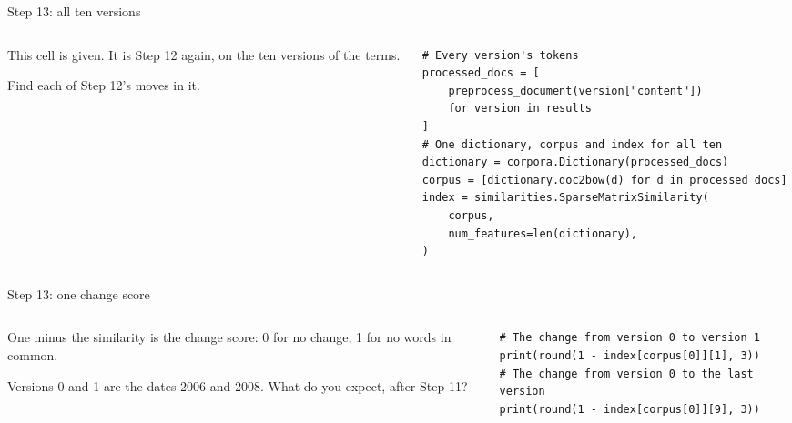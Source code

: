 \documentclass[9pt,aspectratio=169]{beamer}
\begin{document}
\begin{frame}[fragile]{Step 13: all ten versions}
    \begin{columns}[T]
        \begin{column}{0.37\textwidth}
            This cell is given. It is Step 12 again, on the ten versions of the terms.

            \medskip
            Find each of Step 12's moves in it.
        \end{column}
        \begin{column}{0.6\textwidth}
\begin{lstlisting}
# Every version's tokens
processed_docs = [
    preprocess_document(version["content"])
    for version in results
]
# One dictionary, corpus and index for all ten
dictionary = corpora.Dictionary(processed_docs)
corpus = [dictionary.doc2bow(d) for d in processed_docs]
index = similarities.SparseMatrixSimilarity(
    corpus,
    num_features=len(dictionary),
)
\end{lstlisting}
        \end{column}
    \end{columns}
\end{frame}

\begin{frame}[fragile]{Step 13: one change score}
    \begin{columns}[T]
        \begin{column}{0.37\textwidth}
            One minus the similarity is the change score: 0 for no change, 1 for no words in common.

            \medskip
            Versions 0 and 1 are the dates 2006 and 2008. What do you expect, after Step 11?
        \end{column}
        \begin{column}{0.6\textwidth}
\begin{lstlisting}
# The change from version 0 to version 1
print(round(1 - index[corpus[0]][1], 3))
# The change from version 0 to the last version
print(round(1 - index[corpus[0]][9], 3))
\end{lstlisting}
        \end{column}
    \end{columns}
\end{frame}
\end{document}
